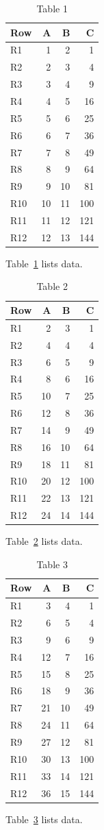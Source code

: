 \documentclass[10pt]{article}
\begin{document}
\listoftables
\begin{table}[ht]\centering\caption{Table 1}\label{tab:1}\begin{tabular}{lrrr}\toprule Row&A&B&C\\\midrule
R1&1&2&1\\
R2&2&3&4\\
R3&3&4&9\\
R4&4&5&16\\
R5&5&6&25\\
R6&6&7&36\\
R7&7&8&49\\
R8&8&9&64\\
R9&9&10&81\\
R10&10&11&100\\
R11&11&12&121\\
R12&12&13&144\\
\bottomrule\end{tabular}\end{table} Table~\ref{tab:1} lists data.
\begin{table}[ht]\centering\caption{Table 2}\label{tab:2}\begin{tabular}{lrrr}\toprule Row&A&B&C\\\midrule
R1&2&3&1\\
R2&4&4&4\\
R3&6&5&9\\
R4&8&6&16\\
R5&10&7&25\\
R6&12&8&36\\
R7&14&9&49\\
R8&16&10&64\\
R9&18&11&81\\
R10&20&12&100\\
R11&22&13&121\\
R12&24&14&144\\
\bottomrule\end{tabular}\end{table} Table~\ref{tab:2} lists data.
\begin{table}[ht]\centering\caption{Table 3}\label{tab:3}\begin{tabular}{lrrr}\toprule Row&A&B&C\\\midrule
R1&3&4&1\\
R2&6&5&4\\
R3&9&6&9\\
R4&12&7&16\\
R5&15&8&25\\
R6&18&9&36\\
R7&21&10&49\\
R8&24&11&64\\
R9&27&12&81\\
R10&30&13&100\\
R11&33&14&121\\
R12&36&15&144\\
\bottomrule\end{tabular}\end{table} Table~\ref{tab:3} lists data.
\end{document}

